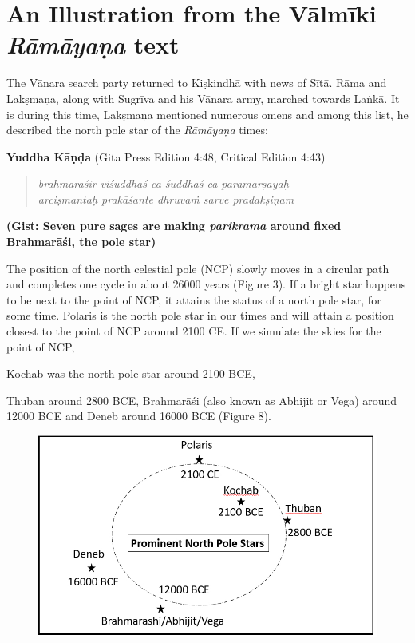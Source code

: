 \vspace{-.3cm}

\section*{An Illustration from \hfill\break the Vālmīki \textit{Rāmāyaṇa} text }

The Vānara search party returned to Kiṣkindhā with news of Sītā. Rāma and Lakṣmaṇa, along with Sugrīva and his Vānara army, marched towards Laṅkā. It is during this time, Lakṣmaṇa mentioned numerous omens and among this list, he described the north pole star of the \textit{Rāmāyaṇa} times:

\textbf{Yuddha Kāṇḍa} (Gita Press Edition 4:48, Critical Edition 4:43)

\begin{verse}
\textit{brahmarāśir viśuddhaś ca śuddhāś ca paramarṣayaḥ }\\\textit{arciṣmantaḥ prakāśante dhruvaṁ sarve pradakṣiṇam }
\end{verse}

\textbf{(Gist: Seven pure sages are making \textit{parikrama} around fixed Brahmarāśi, the pole star)}

The position of the north celestial pole (NCP) slowly moves in a circular path and completes one cycle in about 26000 years (Figure 3). If a bright star happens to be next to the point of NCP, it attains the status of a north pole star, for some time. Polaris is the north pole star in our times and will attain a position closest to the point of NCP around 2100 CE. If we simulate the skies for the point of NCP,

Kochab was the north pole star around 2100 BCE,

Thuban around 2800 BCE, Brahmarāśi (also known as Abhijit or Vega) around 12000 BCE and Deneb around 16000 BCE (Figure 8).

\begin{figure}[!h]
\includegraphics[scale=.32]{images/chap2-10.jpg}
\caption{}\label{chap1-fig8}
\end{figure}

